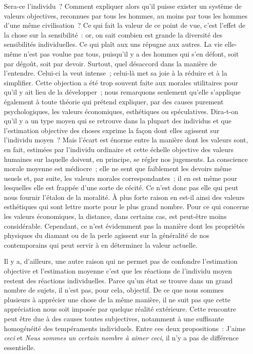 \documentclass[french,twoside]{book} %
\begin{document}
Sera-ce l’individu ? Comment expliquer alors qu’il puisse exister un système de valeurs objectives, reconnues par tous les hommes, au moins par tous les hommes d’une même civilisation ? Ce qui fait la valeur de ce point de vue, c’est l’effet de la chose sur la sensibilité : or, on sait combien est grande la diversité des sensibilités individuelles. Ce qui plaît aux uns répugne aux autres. La vie elle-même n’est pas voulue par tous, puisqu’il y a des hommes qui s’en défont, soit par dégoût, soit par devoir. Surtout, quel désaccord dans la manière de l’entendre. Celui-ci la veut intense ; celui-là met sa joie à la réduire et à la simplifier. Cette objection a été trop souvent faite aux morales utilitaires pour qu’il y ait lieu de la développer ; nous remarquons seulement qu’elle s’applique également à toute théorie qui prétend expliquer, par des causes purement psychologiques, les valeurs économiques, esthétiques ou spéculatives. Dira-t-on qu’il y a un type moyen qui se retrouve dans la plupart des individus et que l’estimation objective des choses exprime la façon dont elles agissent sur l’individu moyen ? Mais l’écart est énorme entre la manière dont les valeurs sont, en fait, estimées par l’individu ordinaire et cette échelle objective des valeurs humaines sur laquelle doivent, en principe, se régler nos jugements. La conscience morale moyenne est médiocre ; elle ne sent que faiblement les devoirs même usuels et, par suite, les valeurs morales correspondantes ; il en est même pour lesquelles elle est frappée d’une sorte de cécité. Ce n’est donc pas elle qui peut nous fournir l’étalon de la moralité. À plus forte raison en est-il ainsi des valeurs esthétiques qui sont lettre morte pour le plus grand nombre. Pour ce qui concerne les valeurs économiques, la distance, dans certains cas, est peut-être moins considérable. Cependant, ce n’est évidemment pas la manière dont les propriétés physiques du diamant ou de la perle agissent sur la généralité de nos contemporains qui peut servir à en déterminer la valeur actuelle.\par
Il y a, d’ailleurs, une autre raison qui ne permet pas de confondre l’estimation objective et l’estimation moyenne c’est que les réactions de l’individu moyen restent des réactions individuelles. Parce qu’un état se trouve dans un grand nombre de sujets, il n’est pas, pour cela, objectif. De ce que nous sommes plusieurs à apprécier une chose de la même manière, il ne suit pas que cette appréciation nous soit imposée par quelque réalité extérieure. Cette rencontre peut être due à des causes toutes subjectives, notamment à une suffisante homogénéité des tempéraments individuels. Entre ces deux propositions : J’aime {\itshape ceci} et {\itshape Nous sommes un certain nombre à aimer ceci}, il n’y a pas de différence essentielle.\par
\end{document}
